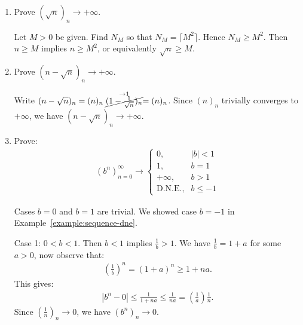     \begin{example}
        \phantom{a}
        \begin{enumerate}[label = (\arabic*)]
            \item Prove $(\sqrt{n})_n \rightarrow +\infty$.
                \begin{solution}
                    Let $M > 0$ be given. Find $N_M$ so that $N_M = \lceil M^2 \rceil$. Hence $N_M \geq M^2$. Then $n \geq M$ implies $n \geq M^2$, or equivalently $\sqrt{n} \geq M$.
                \end{solution}
            
            \item Prove $(n -\sqrt{n})_n \rightarrow +\infty$.
                \begin{solution}
                    Write $(n -\sqrt{n})_n = (n)_n\stackrel{\rightarrow 1}{\cancel{(1-\frac{1}{\sqrt{n}})_n}} = (n)_n$. Since $(n)_n$ trivially converges to $+\infty$, we have $(n -\sqrt{n})_n \rightarrow +\infty$.
                \end{solution}
            
            \item Prove:
                \begin{equation*}
                \begin{split}
                    (b^n)_{n=0}^\infty \rightarrow \begin{cases} 0, & |b| < 1 \\ 1,& b = 1 \\ +\infty, & b > 1 \\ \text{D.N.E.},& b \leq -1\end{cases}
                \end{split}
                \end{equation*}

                \begin{solution}
                    Cases $b=0$ and $b=1$ are trivial. We showed case $b = -1$ in Example~\ref{example:sequence-dne}.

                    Case 1: $0 < b < 1$. Then $b < 1$ implies $\frac{1}{b} > 1$. We have $\frac{1}{b} = 1 + a$ for some $a>0$, now observe that:
                        \begin{equation*}
                        \begin{split}
                            \left(\frac{1}{b}\right)^n = (1+a)^n \geq 1 + na.
                        \end{split}
                        \end{equation*}
                    This gives:
                        \begin{equation*}
                        \begin{split}
                            |b^n - 0| \leq \frac{1}{1+na} \leq \frac{1}{na} = \left(\frac{1}{a}\right) \frac{1}{n}.
                        \end{split}
                        \end{equation*}
                    Since $\left(\frac{1}{n}\right)_n \rightarrow 0$, we have $(b^n)_n \rightarrow 0$.


\end{solution}
\end{enumerate}
\end{example}
